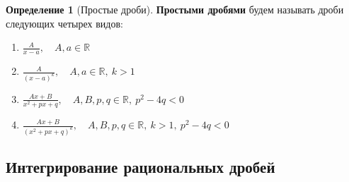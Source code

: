 \documentclass{report}
\theoremstyle{definition}
\newtheorem{definition}{Определение}[section]
\begin{document}
\begin{definition}[Простые дроби]
  \textbf{Простыми дробями} будем называть дроби следующих четырех видов:
  \begin{enumerate}
    \item \(\frac{A}{x - a}, \quad A,a \in \mathbb{R}\)
    \item \(\frac{A}{(x - a)^{k}}, \quad A,a \in \mathbb{R}, \ k > 1\)
    \item \(\frac{Ax + B}{x^{2} + px + q}, \quad A,B,p,q \in \mathbb{R}, \ p^{2} - 4q < 0\)
    \item \(\frac{Ax + B}{(x^{2} + px + q)^{k}}, \quad A,B,p,q \in \mathbb{R}, \ k > 1, \ p^{2} - 4q < 0\)
  \end{enumerate}
\end{definition}

\subsection{Интегрирование рациональных дробей}
\end{document}
